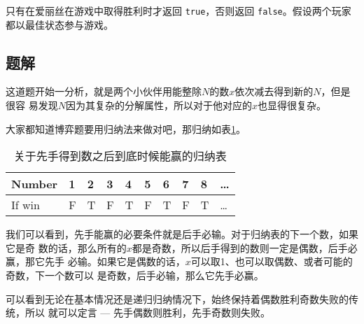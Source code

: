 只有在爱丽丝在游戏中取得胜利时才返回 \verb|true|，否则返回 \verb|false|。假设两个玩家都以最佳状态参与游戏。

\subsection{题解}

这道题开始一分析，就是两个小伙伴用能整除$N$的数$x$依次减去得到新的$N$，但是很容
易发现$N$因为其复杂的分解属性，所以对于他对应的$x$也显得很复杂。

大家都知道博弈题要用归纳法来做对吧，那归纳如表\ref{LeetCode-1025 tab}。

\begin{table}[h]
    \centering
    \begin{tabular}{l|lllllllll}
        \toprule
        Number  & 1 & 2 & 3 & 4 & 5 & 6 & 7 & 8 & \ldots \\
        \midrule
        If win  & F & T & F & T & F & T & F & T & \ldots \\
        \bottomrule
    \end{tabular}
    \caption{关于先手得到数之后到底时候能赢的归纳表}
    \label{LeetCode-1025 tab}
\end{table}

我们可以看到，先手能赢的必要条件就是后手必输。对于归纳表的下一个数，如果它是奇
数的话，那么所有的$x$都是奇数，所以后手得到的数则一定是偶数，后手必赢，那它先手
必输。如果它是偶数的话，$x$可以取1、也可以取偶数、或者可能的奇数，下一个数可以
是奇数，后手必输，那么它先手必赢。

可以看到无论在基本情况还是递归归纳情况下，始终保持着偶数胜利奇数失败的传统，所以
就可以定言 --- 先手偶数则胜利，先手奇数则失败。

